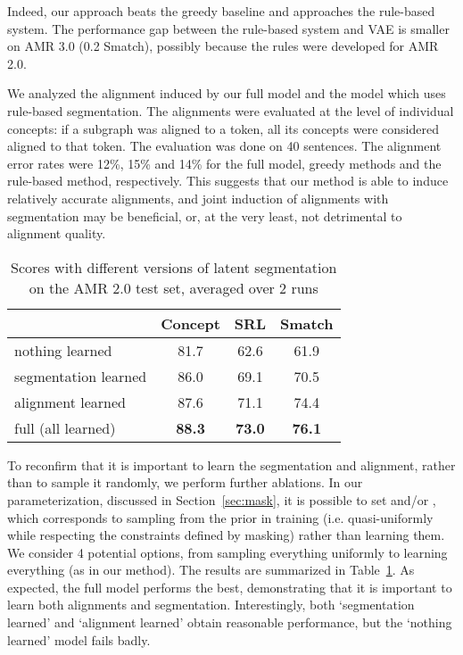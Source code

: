 \documentclass[11pt]{article}
\begin{document}
Indeed, our approach beats the greedy baseline and approaches the rule-based system. The performance gap between the rule-based system and VAE is smaller on AMR 3.0 (0.2 Smatch), possibly because the rules were developed for AMR 2.0. 

   \quad
We analyzed the alignment induced by our full model and the model which uses rule-based segmentation. The alignments were evaluated at the level of individual concepts: if a subgraph was aligned to a token, all its concepts were considered aligned to that token. The evaluation was done on 40 sentences. The alignment error rates were 12\%, 15\% and 14\% for the full model, greedy methods and the rule-based method, respectively. This suggests that our method is able to induce relatively accurate alignments, and joint induction of alignments with segmentation may be beneficial, or, at the very least, not detrimental to alignment quality. 


    \quad
\begin{table}[t!] 
    \begin{center} 
        \begin{tabular}{lccc} 
            \hline     &   Concept & SRL &  Smatch \\\hline
nothing learned    & 81.7  &62.6& 61.9\\
          segmentation learned    & 86.0  &69.1& 70.5\\
          alignment learned     & 87.6  &71.1& 74.4\\
          full  (all learned)     & \bf 88.3 &\bf 73.0&\bf 76.1\\ \hline
        \end{tabular}
    \end{center}
    \vspace{-2ex}
	\caption{\label{table:ablation_vae} Scores with different versions of latent segmentation on the AMR 2.0 test set, averaged over 2 runs
    }
    \vspace{-2ex}
\end{table}
To reconfirm that it is important to learn the segmentation and alignment, rather than to sample it randomly, we perform further ablations. In our parameterization, discussed in Section~\ref{sec:mask},  it is possible to set  and/or , which corresponds to sampling from the prior in training  (i.e. quasi-uniformly while respecting the constraints defined by masking) rather than learning them. We consider 4 potential options, from sampling everything uniformly to learning everything (as in our method). 
The results are summarized in Table~\ref{table:ablation_vae}. As expected, the full model performs the best, demonstrating that it is important to learn both alignments and segmentation. Interestingly, both  `segmentation learned' and `alignment learned' obtain reasonable performance, but the `nothing learned' model fails badly. 
\end{document}
